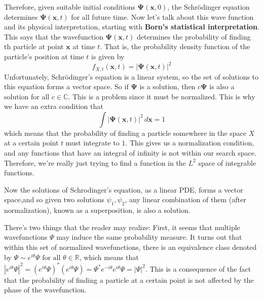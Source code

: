 \documentclass{article}
\begin{document}
    Therefore, given suitable initial conditions $\boldsymbol{\Psi}(\mathbf{x}, 0)$, the Schr\"odinger equation determines $\boldsymbol{\Psi}(\mathbf{x}, t)$ for all future time. Now let's talk about this wave function and its physical interpretation, starting with \textbf{Born's statistical interpretation}. This says that the wavefunction $\boldsymbol{\Psi}(\mathbf{x}, t)$ determines the probability of finding th particle at point $\mathbf{x}$ at time $t$. That is, the probability density function of the particle's position at time $t$ is given by 
    \begin{equation} 
      f_{X, t} (\mathbf{x}, t) = |\boldsymbol{\Psi}(\mathbf{x}, t)|^2
    \end{equation}
    Unfortunately, Schr\"odinger's equation is a linear system, so the set of solutions to this equation forms a vector space. So if $\boldsymbol{\Psi}$ is a solution, then $c \boldsymbol{\Psi}$ is also a solution for all $c \in \mathbb{C}$. This is a problem since it must be normalized. This is why we have an extra condition that 
    \begin{equation} 
    \int |\boldsymbol{\Psi}(\mathbf{x}, t)|^2 \,d \mathbf{x} = 1
    \end{equation}
    which means that the probability of finding a particle somewhere in the space $X$ at a certain point $t$ must integrate to $1$. This gives us a normalization condition, and any functions that have an integral of infinity is not within our search space. Therefore, we're really just trying to find a function in the $L^2$ space of integrable functions. 

    \begin{definition}[Superposition]
      Now the solutions of Schrodinger's equation, as a linear PDE, forms a vector space,and so given two solutions $\psi_1, \psi_2$, any linear combination of them (after normalization), known as a superposition, is also a solution.
    \end{definition}

    There's two things that the reader may realize: First, it seems that multiple wavefunctions $\Psi$ may induce the same probability measure. It turns out that within this set of normalized wavefunctions, there is an equivalence class denoted by $\Psi \sim e^{i \theta} \Psi \text{ for all } \theta \in \mathbb{R}$, which means that $|e^{i \theta} \Psi|^2 = (e^{i \theta} \Psi)^\ast (e^{i \theta} \Psi) = \Psi^\ast e^{-i \theta} e^{i \theta} \Psi = |\Psi|^2$. This is a consequence of the fact that the probability of finding a particle at a certain point is not affected by the phase of the wavefunction.
\end{document}
